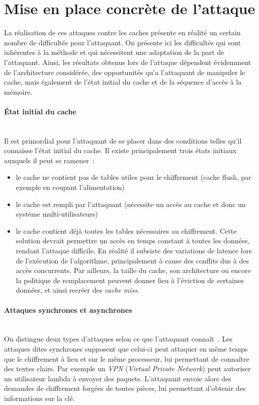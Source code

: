 \documentclass[a4paper,11pt]{article}
\begin{document}
 

\section{Mise en place concrète de l'attaque}

La réalisation de ces attaques contre les caches présente en réalité un certain nombre de difficultés pour l'attaquant. On présente ici les difficultés qui sont inhérentes à la méthode et qui nécessitent une adaptation de la part de l'attaquant. Ainsi, les résultats obtenus lors de l'attaque dépendent évidemment de l'architecture considérée, des opportunités qu'a l'attaquant de manipuler le cache, mais également de l'état initial du cache et de la séquence d'accès à la mémoire. 

\paragraph{État initial du cache} ~\\ 
Il est primordial pour l'attaquant de se placer dans des conditions telles qu'il connaisse l'état initial du cache. Il existe principalement trois états initiaux auxquels il peut se ramener~\cite{canteaut2006understanding}:
\begin{itemize}
\item le cache ne contient pas de tables utiles pour le chiffrement (cache flush, par exemple en coupant l'alimentation)
\item le cache est rempli par l'attaquant (nécessite un accès au cache et donc un système multi-utilisateurs) 
\item le cache contient déjà toutes les tables nécessaires au chiffrement. Cette solution devrait permettre un accès en temps constant à toutes les données, rendant l'attaque difficile. En réalité il subsiste des variations de latence lors de l'exécution de l'algorithme, principalement à cause des conflits dus à des accès concurrents. Par ailleurs, la taille du cache, son architecture ou encore la politique de remplacement peuvent donner lieu à l'éviction de certaines données, et ainsi recréer des \emph{cache miss}.
\end{itemize}

\paragraph{Attaques synchrones et asynchrones} ~\\
On distingue deux types d'attaques selon ce que l'attaquant connaît~\cite{osvik2006cache}. Les attaques dites synchrones supposent que celui-ci peut attaquer en même temps que le chiffrement à lieu et sur le même processeur, lui permettant de connaître des textes clairs. Par exemple un \emph{VPN} (\emph{Virtual Private Network}) peut autoriser un utilisateur lambda à envoyer des paquets. L'attaquant envoie alors des demandes de chiffrement forgées de toutes pièces, lui permettant d'obtenir des informations sur la clé. 
\end{document}
